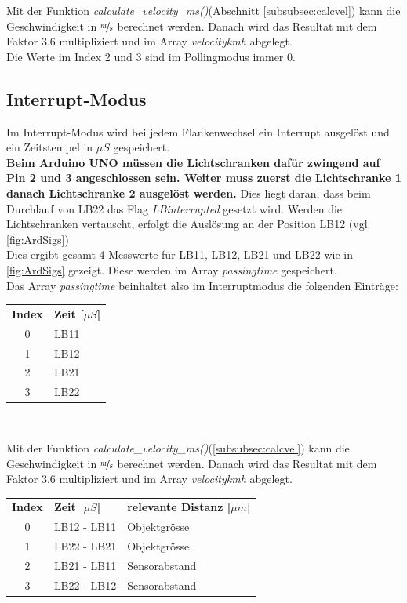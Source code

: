 Mit der Funktion \textit{calculate\_velocity\_ms()}(Abschnitt \ref{subsubsec:calcvel}) kann die Geschwindigkeit in $\nicefrac{m}{s}$ berechnet werden. Danach wird das Resultat mit dem Faktor 3.6 multipliziert und im Array \textit{velocitykmh} abgelegt.\\

Die Werte im Index 2 und 3 sind im Pollingmodus immer 0.\\


\subsection{Interrupt-Modus} \label{subsec:interrupt}
Im Interrupt-Modus wird bei jedem Flankenwechsel ein Interrupt ausgelöst und ein Zeitstempel in $\mu S$ gespeichert.\\
\textbf{Beim Arduino UNO müssen die Lichtschranken dafür zwingend auf Pin 2 und 3 angeschlossen sein. Weiter muss zuerst die Lichtschranke 1 danach Lichtschranke 2 ausgelöst werden.} Dies liegt daran, dass beim Durchlauf von LB22 das Flag \textit{LBinterrupted} gesetzt wird. Werden die Lichtschranken vertauscht, erfolgt die Auslösung an der Position LB12 (vgl. \ref{fig:ArdSigs})\\
Dies ergibt gesamt 4 Messwerte für LB11, LB12, LB21 und LB22 wie in \ref{fig:ArdSigs} gezeigt. Diese werden im Array \textit{passingtime} gespeichert.\\

Das Array \textit{passingtime} beinhaltet also im Interruptmodus die folgenden Einträge:
\begin{center}
    \begin{tabular}{cl}
        \textbf{Index}&\textbf{Zeit [$\mu S$]} \\
        0&LB11 \\
        1&LB12 \\
        2&LB21 \\
        3&LB22 \\
    \end{tabular}\\
\end{center}
Mit der Funktion \textit{calculate\_velocity\_ms()}(\ref{subsubsec:calcvel}) kann die Geschwindigkeit in $\nicefrac{m}{s}$ berechnet werden. Danach wird das Resultat mit dem Faktor 3.6 multipliziert und im Array \textit{velocitykmh} abgelegt.
\begin{center}
    \begin{tabular}{cll}
        \textbf{Index}&\textbf{Zeit [$\mu S$]} & \textbf{relevante Distanz [$\mu m$]} \\
        0&LB12 - LB11 & Objektgrösse\\
        1&LB22 - LB21 & Objektgrösse\\
        2&LB21 - LB11 & Sensorabstand\\
        3&LB22 - LB12 & Sensorabstand\\
    \end{tabular}\\
\end{center}

